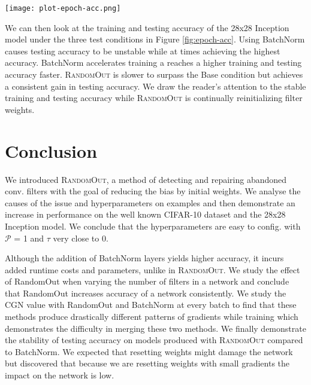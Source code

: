 \documentclass{article}
\begin{document}
\begin{figure*}
\centering
    \texttt{[image: plot-epoch-acc.png]}
\caption{The training and testing accuracy of the 28x28 inception are shown here. The same initial seed is used for all networks so they all start with the same weights. Here it can be seen that the training error of \textsc{RandomOut} is more consistant than BatchNorm.}
\label{fig:epoch-acc}
\end{figure*}


We can then look at the training and testing accuracy of the 28x28 Inception model under the three test conditions in Figure \ref{fig:epoch-acc}. Using BatchNorm causes testing accuracy to be unstable while at times achieving the highest accuracy. BatchNorm accelerates training a reaches a higher training and testing accuracy faster. \textsc{RandomOut} is slower to surpass the Base condition but achieves a consistent gain in testing accuracy. We draw the reader's attention to the stable training and testing accuracy while \textsc{RandomOut} is continually reinitializing filter weights.

	



\section{Conclusion}

We introduced \textsc{RandomOut}, a method of detecting and repairing abandoned conv. filters with the goal of reducing the bias by initial weights. We analyse the causes of the issue and hyperparameters on examples and then demonstrate an increase in performance on the well known CIFAR-10 dataset and the 28x28 Inception model. We conclude that the hyperparameters are easy to config. with $\mathcal{P}$ = 1 and $\tau$ very close to 0.

Although the addition of BatchNorm layers yields higher accuracy, it incurs added runtime costs and parameters, unlike in \textsc{RandomOut}. We study the effect of RandomOut when varying the number of filters in a network and conclude that RandomOut increases accuracy of a network consistently. We study the CGN value with RandomOut and BatchNorm at every batch to find that these methods produce drastically different patterns of gradients while training which demonstrates the difficulty in merging these two methods. We finally demonstrate the stability of testing accuracy on models produced with \textsc{RandomOut} compared to BatchNorm. We expected that resetting weights might damage the network but discovered that because we are resetting weights with small gradients the impact on the network is low.











{\fontsize{9}{9}\selectfont
 

}
\end{document}
